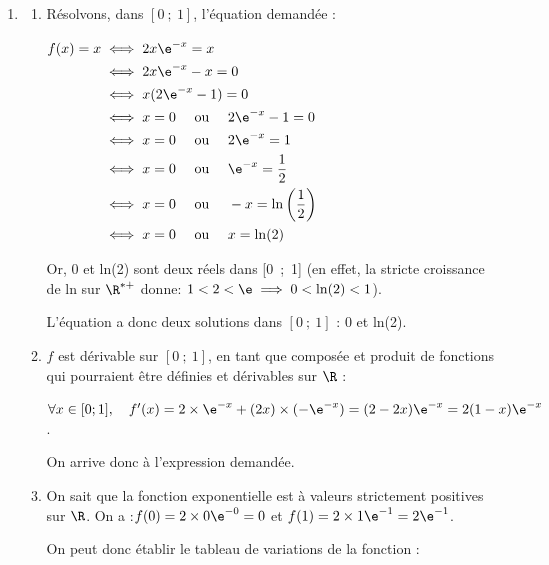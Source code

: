 \medskip

	\begin{enumerate}
		\item \begin{enumerate}
	\item Résolvons, dans $[0~;~1]$, l'équation demandée :

$ \begin{aligned}[t]  f(x) = x &\iff 2x \e^{-x} = x\\
&\iff 2x \e^{-x} - x = 0\\
&\iff x(2\e^{-x}-1) = 0\\
&\iff x = 0 \quad \text{ ou } \quad 2\e^{-x} - 1 = 0\\
&\iff x = 0 \quad \text{ ou } \quad 2\e^{-x} = 1\\
&\iff x = 0 \quad \text{ ou } \quad \e^{-x} = \dfrac{1}{2}\\
&\iff x = 0 \quad \text{ ou } \quad -x = \ln\left(\dfrac{1}{2}\right) \\
&\iff x = 0 \quad \text{ ou } \quad x = \ln(2)
\end{aligned}$

Or, 0 et ln(2) sont deux réels dans [0~;~1] (en effet, la stricte croissance de ln sur $\R^{*+}$ donne: \quad $1 < 2 < \e \implies 0 < \ln(2) < 1$).

L'équation a donc deux solutions dans $ [0~;~1] $ : 0 et ln(2).

	\item $f$ est dérivable sur $ [0~;~1] $, en tant que composée et produit de fonctions qui pourraient être définies et dérivables sur $\R$ :

$\forall x \in [0 ; 1],\quad f'(x) = 2 \times \e^{-x} + (2x) \times (-\e^{-x})
 = (2 - 2x)\e^{-x} = 2(1 -x)\e^{-x}$.

On arrive donc à l'expression demandée.

		\item On sait que la fonction exponentielle est à valeurs strictement positives sur $\R$. On a :\quad $f(0) = 2\times 0 \e^{-0} = 0$ \quad et \quad $f(1) = 2\times 1\e^{-1} = 2\e^{-1}$.

On peut donc établir le tableau de variations de la fonction :

\begin{center}
			\end{center}
		\end{enumerate}


\end{enumerate}
